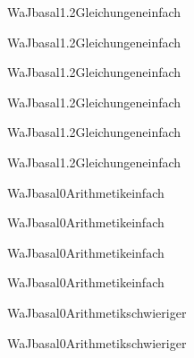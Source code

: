 \documentclass[12pt]{article}
\begin{document}
\begin{Add}{WaJ}{basal1.2}{Gleichungen}{einfach}
\solution{ }
\end{Add}
\begin{Add}{WaJ}{basal1.2}{Gleichungen}{einfach}
\end{Add}

\begin{Add}{WaJ}{basal1.2}{Gleichungen}{einfach}
\solution{ }
\end{Add}
\begin{Add}{WaJ}{basal1.2}{Gleichungen}{einfach}
\end{Add}

\begin{Add}{WaJ}{basal1.2}{Gleichungen}{einfach}
\solution{ }
\end{Add}
\begin{Add}{WaJ}{basal1.2}{Gleichungen}{einfach}
\end{Add}

\begin{Add}{WaJ}{basal0}{Arithmetik}{einfach}
\solution{ }
\end{Add}
\begin{Add}{WaJ}{basal0}{Arithmetik}{einfach}
\end{Add}

\begin{Add}{WaJ}{basal0}{Arithmetik}{einfach}
\solution{ }
\end{Add}
\begin{Add}{WaJ}{basal0}{Arithmetik}{einfach}
\end{Add}

\begin{Add}{WaJ}{basal0}{Arithmetik}{schwieriger}
\solution{ }
\end{Add}
\begin{Add}{WaJ}{basal0}{Arithmetik}{schwieriger}
\end{Add}
\end{document}
